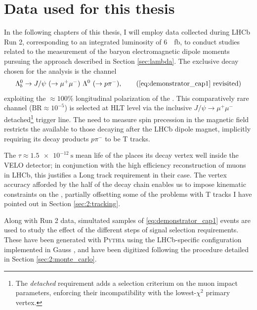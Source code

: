 \section{Data used for this thesis}
\label{sec:2:used_data}
In the following chapters of this thesis, I will employ data collected during LHCb Run 2, corresponding to an integrated luminosity of \SI{6}{\per\femto\barn}, to conduct studies related to the measurement of the \lz baryon electromagnetic dipole moments pursuing the approach described in Section \ref{sec:lambda}.
The exclusive decay chosen for the analysis is the \lbz channel
\begin{equation*}
	\Lambda_b^0 \rightarrow J/\psi~(\rightarrow \mu^+ \mu^-)~\Lambda^0~(\rightarrow p \pi^-), \tag{\ref{eq:demonstrator_cap1} revisited}
\end{equation*}
exploiting the $\approx 100\%$ longitudinal polarization of the \lz.
This comparatively rare channel ($\text{BR} \approx {10}^{-5}$) is selected at HLT level via the inclusive $J/\psi \rightarrow \mu^+\mu^-$ detached\footnote{The \textit{detached} requirement adds a selection criterium on the muon impact parameters, enforcing their incompatibility with the lowest-$\chi^2$ primary vertex.} trigger line.
The need to measure spin precession in the magnetic field restricts the available \lz to those decaying after the LHCb dipole magnet, implicitly requiring its decay products $p\pi^-$ to be T tracks.

The $\tau \approx \SI{1.5e-12}{\second}$ mean life of the \lbz \cite{PDG} places its decay vertex well inside the VELO detector; in conjunction with the high efficiency reconstruction of muons in LHCb, this justifies a Long track requirement in their case.
The \lbz vertex accuracy afforded by the \jpsi half of the decay chain enables us to impose kinematic constraints on the \lz,
partially offsetting some of the problems with T tracks I have pointed out in Section \ref{sec:2:tracking}.

Along with Run 2 data, simultated samples of \eqref{eq:demonstrator_cap1} events are used to study the effect of the different steps of signal selection requirements.
These have been generated with \textsc{Pythia} \cite{Pythia2015} using the LHCb-specific configuration implemented in Gauss \cite{Belyaev_2011}, and have been digitized following the procedure detailed in Section \ref{sec:2:monte_carlo}.